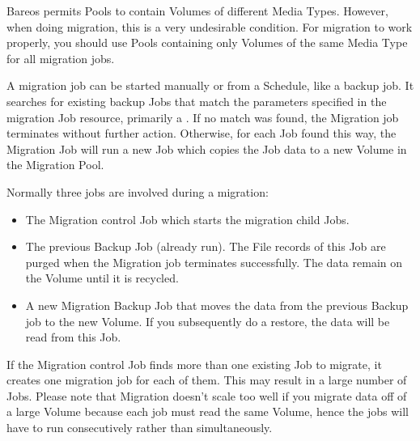 Bareos permits Pools to contain Volumes of different Media Types.
However, when doing migration, this is a very undesirable condition.  For
migration to work properly, you should use Pools containing only Volumes of
the same Media Type for all migration jobs.

A migration job can be started manually or from a Schedule, like
a backup job. It searches for existing backup Jobs that match the
parameters specified in the migration Job resource, primarily a
. If no match was
found, the Migration job terminates without further action. Otherwise,
for each Job found this way, the Migration Job will run a new Job
which copies the Job data to a new Volume in the Migration Pool.

Normally three jobs are involved during a migration:

\begin{itemize}
\item The Migration control Job which starts the migration child Jobs.
\item The previous Backup Job (already run). The File records
      of this Job are purged when the Migration job terminates
      successfully. The data remain on the Volume until it is recycled.

\item A new Migration Backup Job that moves the data from the
      previous Backup job to the new Volume.  If you subsequently
      do a restore, the data will be read from this Job.
\end{itemize}

If the Migration control Job finds more than one existing Job to
migrate, it creates one migration job for each of them. This may result
in a large number of Jobs. Please note that Migration doesn't scale too
well if you migrate data off of a large Volume because each job must
read the same Volume, hence the jobs will have to run consecutively
rather than simultaneously.


